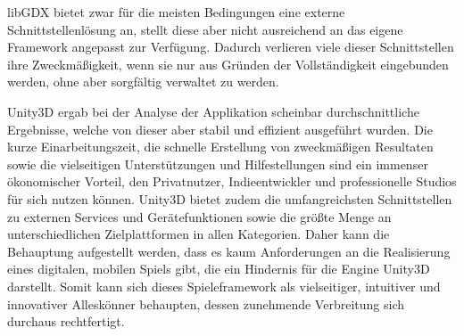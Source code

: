 \bigskip
libGDX bietet zwar für die meisten Bedingungen eine externe Schnittstellenlösung an, stellt diese aber nicht ausreichend an das eigene Framework angepasst zur Verfügung. Dadurch verlieren viele dieser Schnittstellen ihre Zweckmäßigkeit, wenn sie nur aus Gründen der Vollständigkeit eingebunden werden, ohne aber sorgfältig verwaltet zu werden.

\bigskip
Unity3D ergab bei der Analyse der Applikation scheinbar durchschnittliche Ergebnisse, welche von dieser aber stabil und effizient ausgeführt wurden. Die kurze Einarbeitungszeit, die schnelle Erstellung von zweckmäßigen Resultaten sowie die vielseitigen Unterstützungen und Hilfestellungen sind ein immenser ökonomischer Vorteil, den Privatnutzer, Indieentwickler und professionelle Studios für sich nutzen können. Unity3D bietet zudem die umfangreichsten Schnittstellen zu externen Services und Gerätefunktionen sowie die größte Menge an unterschiedlichen Zielplattformen in allen Kategorien. Daher kann die Behauptung aufgestellt werden, dass es kaum Anforderungen an die Realisierung eines digitalen, mobilen Spiels gibt, die ein Hindernis für die Engine Unity3D darstellt. Somit kann sich dieses Spieleframework als vielseitiger, intuitiver und innovativer Alleskönner behaupten, dessen zunehmende Verbreitung sich durchaus rechtfertigt.





\listoffigures %
\listoftables %

